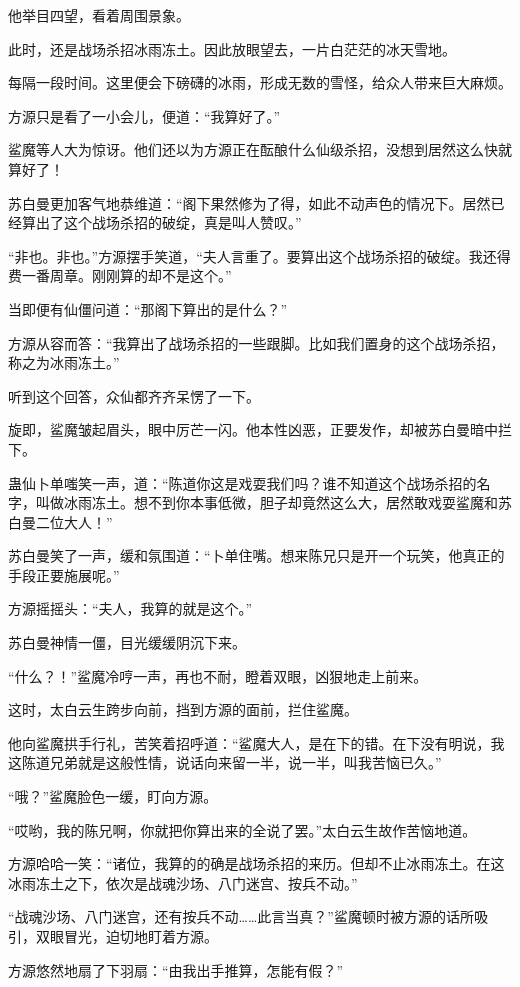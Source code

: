 \begin{this_body}
他举目四望，看着周围景象。

此时，还是战场杀招冰雨冻土。因此放眼望去，一片白茫茫的冰天雪地。

每隔一段时间。这里便会下磅礴的冰雨，形成无数的雪怪，给众人带来巨大麻烦。

方源只是看了一小会儿，便道：“我算好了。”

鲨魔等人大为惊讶。他们还以为方源正在酝酿什么仙级杀招，没想到居然这么快就算好了！

苏白曼更加客气地恭维道：“阁下果然修为了得，如此不动声色的情况下。居然已经算出了这个战场杀招的破绽，真是叫人赞叹。”

“非也。非也。”方源摆手笑道，“夫人言重了。要算出这个战场杀招的破绽。我还得费一番周章。刚刚算的却不是这个。”

当即便有仙僵问道：“那阁下算出的是什么？”

方源从容而答：“我算出了战场杀招的一些跟脚。比如我们置身的这个战场杀招，称之为冰雨冻土。”

听到这个回答，众仙都齐齐呆愣了一下。

旋即，鲨魔皱起眉头，眼中厉芒一闪。他本性凶恶，正要发作，却被苏白曼暗中拦下。

蛊仙卜单嗤笑一声，道：“陈道你这是戏耍我们吗？谁不知道这个战场杀招的名字，叫做冰雨冻土。想不到你本事低微，胆子却竟然这么大，居然敢戏耍鲨魔和苏白曼二位大人！”

苏白曼笑了一声，缓和氛围道：“卜单住嘴。想来陈兄只是开一个玩笑，他真正的手段正要施展呢。”

方源摇摇头：“夫人，我算的就是这个。”

苏白曼神情一僵，目光缓缓阴沉下来。

“什么？！”鲨魔冷哼一声，再也不耐，瞪着双眼，凶狠地走上前来。

这时，太白云生跨步向前，挡到方源的面前，拦住鲨魔。

他向鲨魔拱手行礼，苦笑着招呼道：“鲨魔大人，是在下的错。在下没有明说，我这陈道兄弟就是这般性情，说话向来留一半，说一半，叫我苦恼已久。”

“哦？”鲨魔脸色一缓，盯向方源。

“哎哟，我的陈兄啊，你就把你算出来的全说了罢。”太白云生故作苦恼地道。

方源哈哈一笑：“诸位，我算的的确是战场杀招的来历。但却不止冰雨冻土。在这冰雨冻土之下，依次是战魂沙场、八门迷宫、按兵不动。”

“战魂沙场、八门迷宫，还有按兵不动……此言当真？”鲨魔顿时被方源的话所吸引，双眼冒光，迫切地盯着方源。

方源悠然地扇了下羽扇：“由我出手推算，怎能有假？”


\end{this_body}
